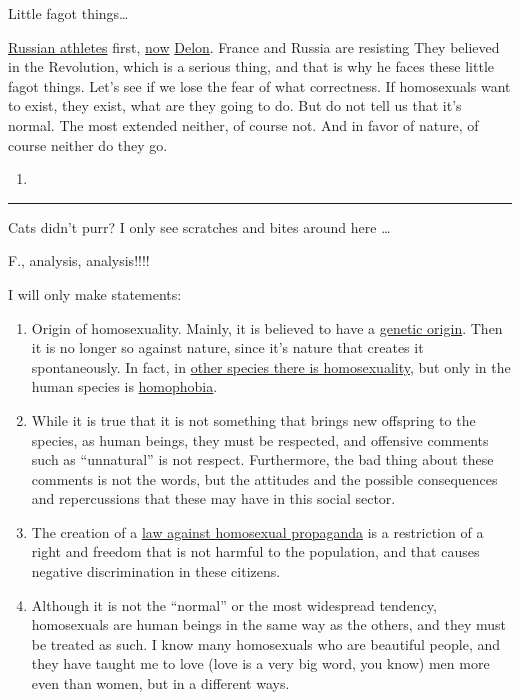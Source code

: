 \documentclass[]{book}
\begin{document}
Little fagot things\ldots{}

\href{https://en.wikipedia.org/wiki/Kseniya_Ryzhova\#2013_Moscow_kiss}{Russian athletes} first, \href{http://www.elmundo.es/elmundo/2013/09/03/gentes/1378227703.html}{now} \href{https://en.wikipedia.org/wiki/Alain_Delon}{Delon}. France and Russia are resisting They believed in the Revolution, which is a serious thing, and that is why he faces these little fagot things. Let's see if we lose the fear of what correctness. If homosexuals want to exist, they exist, what are they going to do. But do not tell us that it's normal. The most extended neither, of course not. And in favor of nature, of course neither do they go.

\begin{enumerate}
\def\labelenumi{\Alph{enumi}.}
\setcounter{enumi}{5}
\item
\end{enumerate}

\begin{center}\rule{0.5\linewidth}{\linethickness}\end{center}

Cats didn't purr? I only see scratches and bites around here \ldots{}

F., analysis, analysis!!!!

I will only make statements:

\begin{enumerate}
\def\labelenumi{\arabic{enumi}.}
\item
  Origin of homosexuality. Mainly, it is believed to have a \href{https://en.wikipedia.org/wiki/Homosexuality\#Causes}{genetic origin}. Then it is no longer so against nature, since it's nature that creates it spontaneously. In fact, in \href{https://en.wikipedia.org/wiki/Homosexuality\#Homosexual_behavior_in_other_animals}{other species there is homosexuality}, but only in the human species is \href{https://en.wikipedia.org/wiki/Homophobia}{homophobia}.
\item
  While it is true that it is not something that brings new offspring to the species, as human beings, they must be respected, and offensive comments such as ``unnatural'' is not respect. Furthermore, the bad thing about these comments is not the words, but the attitudes and the possible consequences and repercussions that these may have in this social sector.
\item
  The creation of a \href{https://en.wikipedia.org/wiki/Russian_gay_propaganda_law}{law against homosexual propaganda} is a restriction of a right and freedom that is not harmful to the population, and that causes negative discrimination in these citizens.
\item
  Although it is not the ``normal'' or the most widespread tendency, homosexuals are human beings in the same way as the others, and they must be treated as such. I know many homosexuals who are beautiful people, and they have taught me to love (love is a very big word, you know) men more even than women, but in a different ways.
\end{enumerate}
\end{document}
